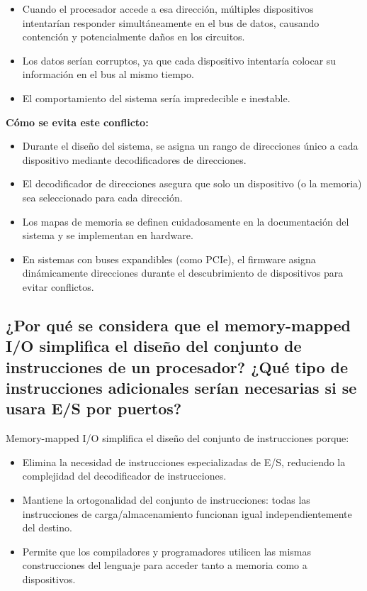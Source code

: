\documentclass[12pt]{article}
\begin{document}
	\begin{itemize}
		\item Cuando el procesador accede a esa dirección, múltiples dispositivos intentarían responder simultáneamente en el bus de datos, causando contención y potencialmente daños en los circuitos.
		\item Los datos serían corruptos, ya que cada dispositivo intentaría colocar su información en el bus al mismo tiempo.
		\item El comportamiento del sistema sería impredecible e inestable.
	\end{itemize}
	
	\textbf{Cómo se evita este conflicto:}
	\begin{itemize}
		\item Durante el diseño del sistema, se asigna un rango de direcciones único a cada dispositivo mediante decodificadores de direcciones.
		\item El decodificador de direcciones asegura que solo un dispositivo (o la memoria) sea seleccionado para cada dirección.
		\item Los mapas de memoria se definen cuidadosamente en la documentación del sistema y se implementan en hardware.
		\item En sistemas con buses expandibles (como PCIe), el firmware asigna dinámicamente direcciones durante el descubrimiento de dispositivos para evitar conflictos.
	\end{itemize}
	
\subsection{¿Por qué se considera que el memory-mapped I/O simplifica el diseño del conjunto de instrucciones de un procesador? ¿Qué tipo de instrucciones adicionales serían necesarias si se usara E/S por puertos?}
	
Memory-mapped I/O simplifica el diseño del conjunto de instrucciones porque:

\begin{itemize}
	\item Elimina la necesidad de instrucciones especializadas de E/S, reduciendo la complejidad del decodificador de instrucciones.
	\item Mantiene la ortogonalidad del conjunto de instrucciones: todas las instrucciones de carga/almacenamiento funcionan igual independientemente del destino.
	\item Permite que los compiladores y programadores utilicen las mismas construcciones del lenguaje para acceder tanto a memoria como a dispositivos.
\end{itemize}
\end{document}
